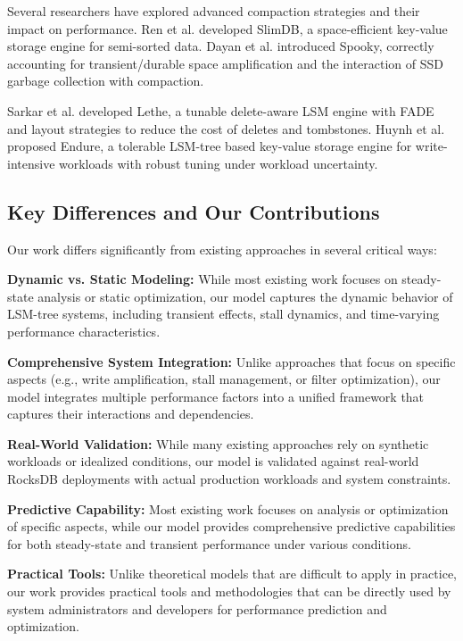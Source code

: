 \documentclass[11pt]{article}
\begin{document}
Several researchers have explored advanced compaction strategies and their impact on performance. Ren et al. \cite{ren2017slimdb} developed SlimDB, a space-efficient key-value storage engine for semi-sorted data. Dayan et al. \cite{dayan2022spooky} introduced Spooky, correctly accounting for transient/durable space amplification and the interaction of SSD garbage collection with compaction.

Sarkar et al. \cite{sarkar2020lethe} developed Lethe, a tunable delete-aware LSM engine with FADE and layout strategies to reduce the cost of deletes and tombstones. Huynh et al. \cite{huynh2022endure} proposed Endure, a tolerable LSM-tree based key-value storage engine for write-intensive workloads with robust tuning under workload uncertainty.

\subsection{Key Differences and Our Contributions}

Our work differs significantly from existing approaches in several critical ways:

\textbf{Dynamic vs. Static Modeling:} While most existing work focuses on steady-state analysis or static optimization, our model captures the dynamic behavior of LSM-tree systems, including transient effects, stall dynamics, and time-varying performance characteristics.

\textbf{Comprehensive System Integration:} Unlike approaches that focus on specific aspects (e.g., write amplification, stall management, or filter optimization), our model integrates multiple performance factors into a unified framework that captures their interactions and dependencies.

\textbf{Real-World Validation:} While many existing approaches rely on synthetic workloads or idealized conditions, our model is validated against real-world RocksDB deployments with actual production workloads and system constraints.

\textbf{Predictive Capability:} Most existing work focuses on analysis or optimization of specific aspects, while our model provides comprehensive predictive capabilities for both steady-state and transient performance under various conditions.

\textbf{Practical Tools:} Unlike theoretical models that are difficult to apply in practice, our work provides practical tools and methodologies that can be directly used by system administrators and developers for performance prediction and optimization.
\end{document}
